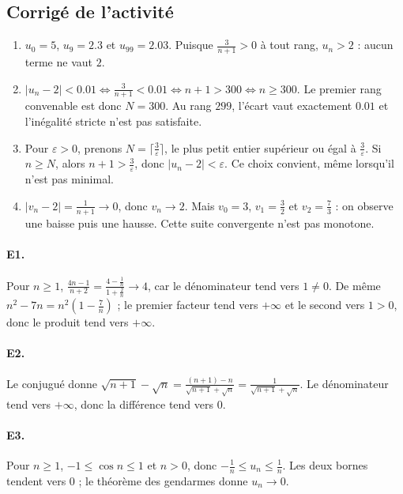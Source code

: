 \subsection{Corrigé de l'activité}\begin{enumerate}
\item $u_0=5$, $u_9=\num{2,3}$ et $u_{99}=\num{2,03}$. Puisque $\frac{3}{n+1}>0$ à tout rang, $u_n>2$ : aucun terme ne vaut $2$.
\item $|u_n-2|<\num{0,01}\Longleftrightarrow \frac{3}{n+1}<\num{0,01}\Longleftrightarrow n+1>300\Longleftrightarrow n\ge300$. Le premier rang convenable est donc $N=300$. Au rang $299$, l'écart vaut exactement $\num{0,01}$ et l'inégalité stricte n'est pas satisfaite.
\item Pour $\varepsilon>0$, prenons $N=\lceil\frac{3}{\varepsilon}\rceil$, le plus petit entier supérieur ou égal à $\frac{3}{\varepsilon}$. Si $n\ge N$, alors $n+1>\frac{3}{\varepsilon}$, donc $|u_n-2|<\varepsilon$. Ce choix convient, même lorsqu'il n'est pas minimal.
\item $|v_n-2|=\frac{1}{n+1}\to0$, donc $v_n\to2$. Mais $v_0=3$, $v_1=\frac{3}{2}$ et $v_2=\frac{7}{3}$ : on observe une baisse puis une hausse. Cette suite convergente n'est pas monotone.
\end{enumerate}

\paragraph{E1.}Pour $n\ge1$, $\frac{4n-1}{n+2}=\frac{4-\frac{1}{n}}{1+\frac{2}{n}}\to4$, car le dénominateur tend vers $1\ne0$. De même $n^2-7n=n^2(1-\frac{7}{n})$ ; le premier facteur tend vers $+\infty$ et le second vers $1>0$, donc le produit tend vers $+\infty$.

\paragraph{E2.}Le conjugué donne $\sqrt{n+1}-\sqrt{n}=\frac{(n+1)-n}{\sqrt{n+1}+\sqrt n}=\frac{1}{\sqrt{n+1}+\sqrt n}$. Le dénominateur tend vers $+\infty$, donc la différence tend vers $0$.

\paragraph{E3.}Pour $n\ge1$, $-1\le\cos n\le1$ et $n>0$, donc $-\frac{1}{n}\le u_n\le\frac{1}{n}$. Les deux bornes tendent vers $0$ ; le théorème des gendarmes donne $u_n\to0$.

